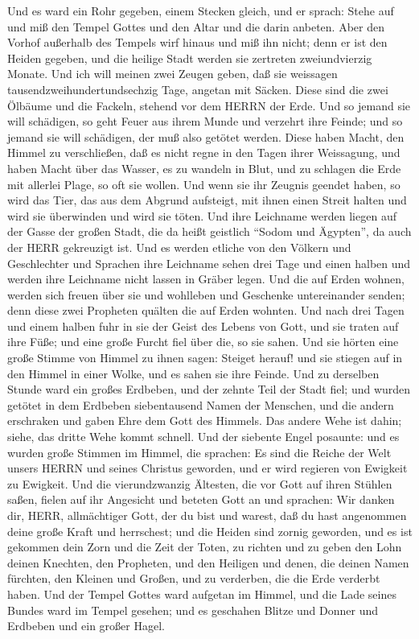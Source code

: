  Und es ward ein Rohr gegeben, einem Stecken gleich, und er
sprach: Stehe auf und miß den Tempel Gottes und den Altar und die darin
anbeten.  Aber den Vorhof außerhalb des Tempels wirf hinaus
und miß ihn nicht; denn er ist den Heiden gegeben, und die heilige Stadt
werden sie zertreten zweiundvierzig Monate.  Und ich will
meinen zwei Zeugen geben, daß sie weissagen tausendzweihundertundsechzig
Tage, angetan mit Säcken.  Diese sind die zwei Ölbäume und
die Fackeln, stehend vor dem HERRN der Erde.  Und so jemand
sie will schädigen, so geht Feuer aus ihrem Munde und verzehrt ihre
Feinde; und so jemand sie will schädigen, der muß also getötet werden.
 Diese haben Macht, den Himmel zu verschließen, daß es nicht
regne in den Tagen ihrer Weissagung, und haben Macht über das Wasser, es
zu wandeln in Blut, und zu schlagen die Erde mit allerlei Plage, so oft
sie wollen.  Und wenn sie ihr Zeugnis geendet haben, so wird
das Tier, das aus dem Abgrund aufsteigt, mit ihnen einen Streit halten
und wird sie überwinden und wird sie töten.  Und ihre
Leichname werden liegen auf der Gasse der großen Stadt, die da heißt
geistlich ``Sodom und Ägypten'', da auch der HERR gekreuzigt ist.
 Und es werden etliche von den Völkern und Geschlechter und
Sprachen ihre Leichname sehen drei Tage und einen halben und werden ihre
Leichname nicht lassen in Gräber legen.  Und die auf Erden
wohnen, werden sich freuen über sie und wohlleben und Geschenke
untereinander senden; denn diese zwei Propheten quälten die auf Erden
wohnten.  Und nach drei Tagen und einem halben fuhr in sie
der Geist des Lebens von Gott, und sie traten auf ihre Füße; und eine
große Furcht fiel über die, so sie sahen.  Und sie hörten
eine große Stimme von Himmel zu ihnen sagen: Steiget herauf! und sie
stiegen auf in den Himmel in einer Wolke, und es sahen sie ihre Feinde.
 Und zu derselben Stunde ward ein großes Erdbeben, und der
zehnte Teil der Stadt fiel; und wurden getötet in dem Erdbeben
siebentausend Namen der Menschen, und die andern erschraken und gaben
Ehre dem Gott des Himmels.  Das andere Wehe ist dahin;
siehe, das dritte Wehe kommt schnell.  Und der siebente
Engel posaunte: und es wurden große Stimmen im Himmel, die sprachen: Es
sind die Reiche der Welt unsers HERRN und seines Christus geworden, und
er wird regieren von Ewigkeit zu Ewigkeit.  Und die
vierundzwanzig Ältesten, die vor Gott auf ihren Stühlen saßen, fielen
auf ihr Angesicht und beteten Gott an  und sprachen: Wir
danken dir, HERR, allmächtiger Gott, der du bist und warest, daß du hast
angenommen deine große Kraft und herrschest;  und die
Heiden sind zornig geworden, und es ist gekommen dein Zorn und die Zeit
der Toten, zu richten und zu geben den Lohn deinen Knechten, den
Propheten, und den Heiligen und denen, die deinen Namen fürchten, den
Kleinen und Großen, und zu verderben, die die Erde verderbt haben.
 Und der Tempel Gottes ward aufgetan im Himmel, und die
Lade seines Bundes ward im Tempel gesehen; und es geschahen Blitze und
Donner und Erdbeben und ein großer Hagel.

